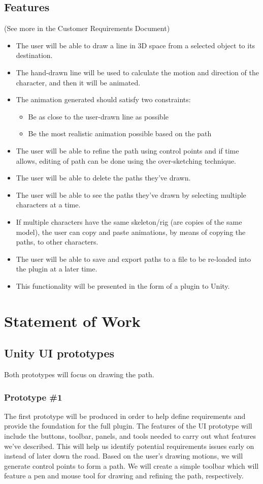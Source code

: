 \documentclass[12pt]{article}
\begin{document}
\subsection{Features}
(See more in the Customer Requirements Document)
\begin{itemize}
 \item The user will be able to draw a line in 3D space from a selected object to its destination.
 \item The hand-drawn line will be used to calculate the motion and direction of the character, and then it will be animated.
 \item The animation generated should satisfy two constraints:
	\begin{itemize}
	  \item Be as close to the user-drawn line as possible
	  \item Be the most realistic animation possible based on the path
	\end{itemize}
 \item The user will be able to refine the path using control points and if time allows, editing of path can be done using the over-sketching technique.
 \item The user will be able to delete the paths they've drawn.
 \item The user will be able to see the paths they've drawn by selecting multiple characters at a time.
 \item If multiple characters have the same skeleton/rig (are copies of the same model), the user can copy and paste animations, by means of copying the paths, to other characters.
\item The user will be able to save and export paths to a file to be re-loaded into the plugin at a later time.
 \item This functionality will be presented in the form of a plugin to Unity.
\end{itemize}


\section{Statement of Work}
\label{sec:work}
\subsection{Unity UI prototypes}
Both prototypes will focus on drawing the path.

\subsubsection{Prototype \#1} 
\label{sec:ptype1}
The first prototype will be produced in order to help define requirements and provide the foundation for the full plugin. The features of the UI prototype will include the buttons, toolbar, panels, and tools needed to carry out what features we've described. This will help us identify potential requirements issues early on instead of later down the road. Based on the user's drawing motions, we will generate control points to form a path. We will create a simple toolbar which will feature a pen and mouse tool for drawing and refining the path, respectively. 
\end{document}
